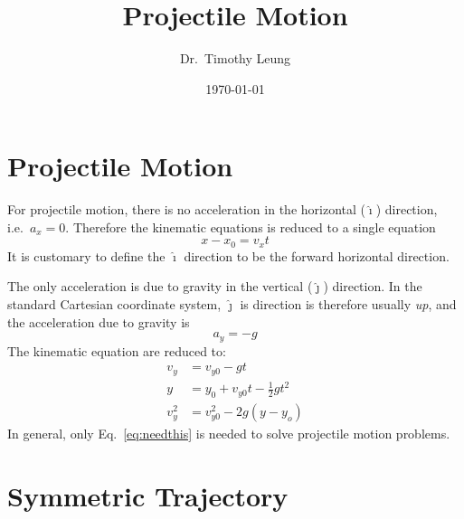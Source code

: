 \documentclass{../../../oss-handout}
\title{Projectile Motion}
\author{Dr.\ Timothy Leung}
\date{\today}
\begin{document}
\thispagestyle{title}
\gentitle

\section{Projectile Motion}

For projectile motion, there is no acceleration in the horizontal
($\bm{\hat{\imath}}$) direction, i.e.\ $a_x=0$. Therefore the kinematic
equations is reduced to a single equation
\begin{equation}
  x-x_0=v_xt
\end{equation}
It is customary to define the $\bm{\hat{\imath}}$ direction to be the forward
horizontal direction.

The only acceleration is due to gravity in the vertical ($\bm{\hat{\jmath}}$)
direction. In the standard Cartesian coordinate system, $\bm{\hat{\jmath}}$ is
direction is therefore usually \emph{up}, and the acceleration due to gravity is
\begin{equation}
  a_y=-g
\end{equation}
The kinematic equation are reduced to:
\begin{align}
  v_y&=v_{y0}-gt\\
  y&=y_0+v_{y0}t-\frac12 gt^2\label{eq:needthis}\\
  v_y^2&=v_{y0}^2-2g(y-y_o)
\end{align}
In general, only Eq.~\ref{eq:needthis} is needed to solve projectile motion
problems.

\section{Symmetric Trajectory}
\end{document}
